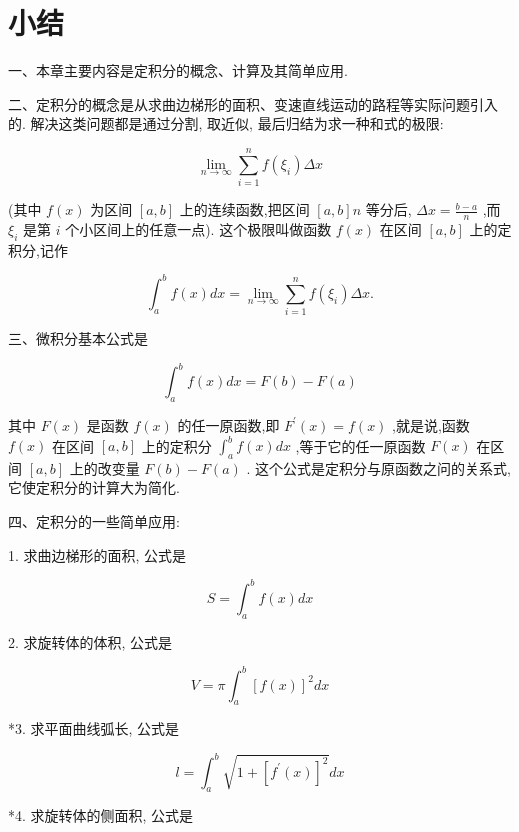 \documentclass[lang=cn,newtx,12pt,scheme=chinese]{elegantbook}
\begin{document}
\chapter*{小结}

一、本章主要内容是定积分的概念、计算及其简单应用.

二、定积分的概念是从求曲边梯形的面积、变速直线运动的路程等实际问题引入的. 解决这类问题都是通过分割, 取近似, 最后归结为求一种和式的极限:

\[
\mathop{\lim }\limits_{{n \rightarrow \infty }}\mathop{\sum }\limits_{{i = 1}}^{n}f\left( {\xi }_{i}\right) {\Delta x}
\]

(其中 \(f\left( x\right)\) 为区间 \(\left\lbrack {a,b}\right\rbrack\) 上的连续函数,把区间 \(\left\lbrack {a,b}\right\rbrack n\) 等分后, \({\Delta x} = \frac{b - a}{n}\) ,而 \({\xi }_{i}\) 是第 \(i\) 个小区间上的任意一点). 这个极限叫做函数 \(f\left( x\right)\) 在区间 \(\left\lbrack {a,b}\right\rbrack\) 上的定积分,记作

\[
{\int }_{a}^{b}f\left( x\right) {dx} = \mathop{\lim }\limits_{{n \rightarrow \infty }}\mathop{\sum }\limits_{{i = 1}}^{n}f\left( {\xi }_{i}\right) {\Delta x}.
\]

三、微积分基本公式是

\[
{\int }_{a}^{b}f\left( x\right) {dx} = F\left( b\right) - F\left( a\right)
\]

其中 \(F\left( x\right)\) 是函数 \(f\left( x\right)\) 的任一原函数,即 \({F}^{\prime }\left( x\right) = f\left( x\right)\) ,就是说,函数 \(f\left( x\right)\) 在区间 \(\left\lbrack {a,b}\right\rbrack\) 上的定积分 \({\int }_{a}^{b}f\left( x\right) {dx}\) ,等于它的任一原函数 \(F\left( x\right)\) 在区间 \(\left\lbrack {a,b}\right\rbrack\) 上的改变量 \(F\left( b\right) - F\left( a\right)\) . 这个公式是定积分与原函数之问的关系式, 它使定积分的计算大为简化.

四、定积分的一些简单应用:

1. 求曲边梯形的面积, 公式是

\[
S = {\int }_{a}^{b}f\left( x\right) {dx}
\]

2. 求旋转体的体积, 公式是

\[
V = \pi {\int }_{a}^{b}{\left\lbrack f\left( x\right) \right\rbrack }^{2}{dx}
\]

*3. 求平面曲线弧长, 公式是

\[
l = {\int }_{a}^{b}\sqrt{1 + {\left\lbrack {f}^{\prime }\left( x\right) \right\rbrack }^{2}}{dx}
\]

*4. 求旋转体的侧面积, 公式是
\end{document}

